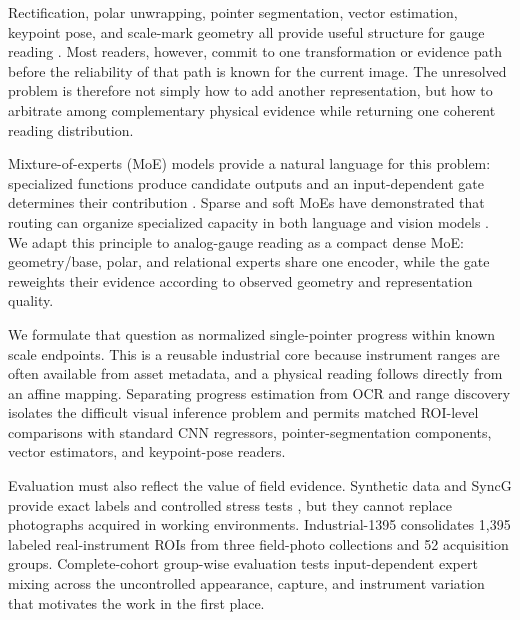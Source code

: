 \documentclass[electronics,article,submit,oneauthor]{Definitions/mdpi}
\begin{document}
Rectification, polar unwrapping, pointer segmentation, vector estimation, keypoint pose, and scale-mark geometry all provide useful structure for gauge reading \cite{bao2019ipm,li2020text,wu2021lowlight,dong2021vdn,wang2022scalemark,tan2024transunet}. Most readers, however, commit to one transformation or evidence path before the reliability of that path is known for the current image. The unresolved problem is therefore not simply how to add another representation, but how to arbitrate among complementary physical evidence while returning one coherent reading distribution.

Mixture-of-experts (MoE) models provide a natural language for this problem: specialized functions produce candidate outputs and an input-dependent gate determines their contribution \cite{jacobs1991adaptive}. Sparse and soft MoEs have demonstrated that routing can organize specialized capacity in both language and vision models \cite{shazeer2017sparsely,riquelme2021vmoe,puigcerver2024softmoe}. We adapt this principle to analog-gauge reading as a compact dense MoE: geometry/base, polar, and relational experts share one encoder, while the gate reweights their evidence according to observed geometry and representation quality.

We formulate that question as normalized single-pointer progress within known scale endpoints. This is a reusable industrial core because instrument ranges are often available from asset metadata, and a physical reading follows directly from an affine mapping. Separating progress estimation from OCR and range discovery isolates the difficult visual inference problem and permits matched ROI-level comparisons with standard CNN regressors, pointer-segmentation components, vector estimators, and keypoint-pose readers.

Evaluation must also reflect the value of field evidence. Synthetic data and SyncG provide exact labels and controlled stress tests \cite{howells2021analogue,leonalcazar2024synthetic,deng2026syncg}, but they cannot replace photographs acquired in working environments. Industrial-1395 consolidates 1,395 labeled real-instrument ROIs from three field-photo collections and 52 acquisition groups. Complete-cohort group-wise evaluation tests input-dependent expert mixing across the uncontrolled appearance, capture, and instrument variation that motivates the work in the first place.
\end{document}
